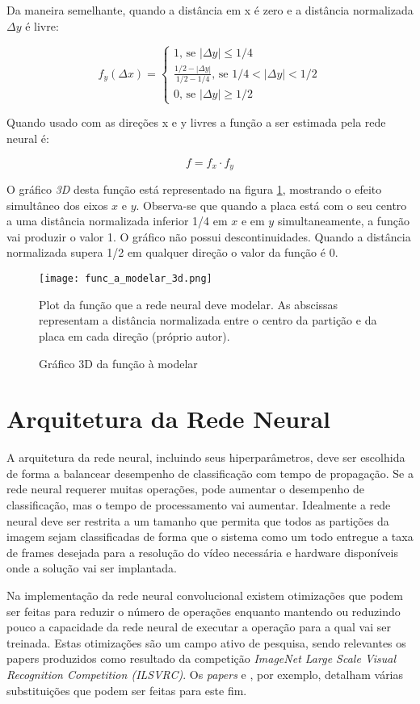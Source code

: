 Da maneira semelhante, quando a distância em x é zero e a distância 
normalizada $\Delta y$ é livre:

\begin{equation}
	f_y(\Delta x) = \begin{cases}
		1 \text{, se } |\Delta y| \leq 1/4
		\\
		\frac{1/2-|\Delta y|}{1/2-1/4} \text{, se } 1/4<|\Delta y|<1/2
		\\
		0 \text{, se } |\Delta y| \geq 1/2
	\end{cases}
\end{equation}

Quando usado com as direções x e y livres a função a ser estimada pela rede
neural é:

\begin{equation} \label{eq:funcao_a_modelar}
	f=f_x \cdot f_y
\end{equation}

O gráfico \emph{3D} desta função está representado na figura
\ref{fig:func_a_modelar_3d}, mostrando o
efeito simultâneo dos eixos $x$ e $y$.  Observa-se que quando a placa
está com o seu centro a uma distância normalizada inferior 1/4 em $x$ e em $y$
simultaneamente, a função vai produzir o valor 1. O gráfico não possui
descontinuidades. Quando a distância normalizada supera 1/2 em qualquer
direção o valor da função é 0.

\begin{figure}[!htb]
	\centering
	\texttt{[image: func\_a\_modelar\_3d.png]}
	\caption{Gráfico 3D da função à modelar}
	\label{fig:func_a_modelar_3d}
	Plot da função que a rede neural deve modelar. As abscissas representam a
	distância normalizada entre o centro da partição e da placa em cada direção
	(próprio autor).
\end{figure}


\section{Arquitetura da Rede Neural}

A arquitetura da rede neural, incluindo seus hiperparâmetros, deve ser
escolhida de forma a balancear desempenho de classificação com tempo de
propagação. Se a rede neural requerer muitas operações, pode aumentar o
desempenho de classificação, mas o tempo de processamento vai aumentar.
Idealmente a rede neural deve ser restrita a um tamanho que permita que todos
as partições da imagem sejam classificadas de forma que o sistema como um todo
entregue a taxa de frames desejada para a resolução do vídeo necessária e
hardware disponíveis onde a solução vai ser implantada.

Na implementação da rede neural convolucional existem otimizações que podem ser
feitas para reduzir o número de operações enquanto mantendo ou reduzindo pouco
a capacidade da rede neural de executar a operação para a qual vai ser
treinada. Estas otimizações são um campo ativo de pesquisa, sendo relevantes os
papers produzidos como resultado da competição \emph{ImageNet Large Scale
Visual Recognition Competition (ILSVRC)}. Os \emph{papers}
\cite{szegedy2015going} e \cite{szegedy2015rethinking},
por exemplo, detalham várias substituições que podem ser feitas para este fim.


